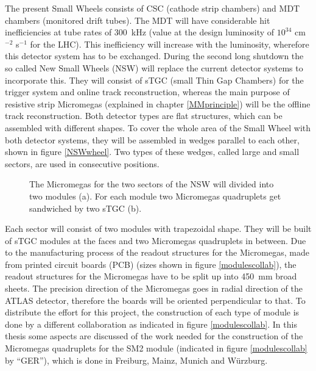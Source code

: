 \documentclass[
a4paper,                                %
twoside,                                %
BCOR1.4cm,                      %
10pt,                           %
headings=normal,                %
headsepline,                    %
clearplainpage, %
final,                                  %
div=14,
parskip=full,
openright,
bibliography=toc
]{scrreprt}
\begin{document}
The present Small Wheels consists of CSC (cathode strip chambers) and MDT chambers (monitored drift tubes). The MDT will have considerable hit inefficiencies at tube rates of \SI{300}{\kHz} (value at the design luminosity of $10^{34}$ cm$^{-2}$ s$^{-1}$ for the LHC). This inefficiency will increase with the luminosity, wherefore this detector system has to be exchanged. During the second long shutdown the so called New Small Wheels (NSW) will replace the current detector systems to incorporate this. They will consist of sTGC (small Thin Gap Chambers) for the trigger system and online track reconstruction, whereas the main purpose of resistive strip Micromegas (explained in chapter \ref{MMprinciple}) will be the offline track reconstruction. Both detector types are flat structures, which can be assembled with different shapes. To cover the whole area of the Small Wheel with both detector systems, they will be assembled in wedges parallel to each other, shown in figure \ref{NSWwheel}. Two types of these wedges, called large and small sectors, are used in consecutive positions. \cite{NSW_TDR}

\begin{figure}[H]	
	\centering
	\qquad
	\caption{The Micromegas for the two sectors of the NSW will divided into two modules (a). For each module two Micromegas quadruplets get sandwiched by two sTGC (b).}
	\label{modulesnatlay}
\end{figure}

Each sector will consist of two modules with trapezoidal shape. They will be built of sTGC modules at the faces and two Micromegas quadruplets in between. Due to the manufacturing process of the readout structures for the Micromegas, made from printed circuit boards (PCB) (sizes shown in figure \ref{modulescollab}), the readout structures for the Micromegas have to be split up into \SI{450}{\mm} broad sheets. The precision direction of the Micromegas goes in radial direction of the ATLAS detector, therefore the boards will be oriented perpendicular to that. To distribute the effort for this project, the construction of each type of module is done by a different collaboration as indicated in figure \ref{modulescollab}. In this thesis some aspects are discussed of the work needed for the construction of the Micromegas quadruplets for the SM2 module (indicated in figure \ref{modulescollab} by ``GER''), which is done in Freiburg, Mainz, Munich and W\"urzburg.
\end{document}
